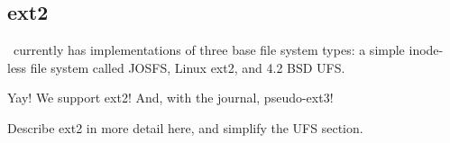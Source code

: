 \subsection{ext2}
\label{sec:modules:ext2}

\Kudos\ currently has implementations of three base file system types: a simple
inode-less file system called JOSFS, Linux ext2, and 4.2 BSD UFS.

Yay! We support ext2! And, with the journal, pseudo-ext3!

Describe ext2 in more detail here, and simplify the UFS section.
